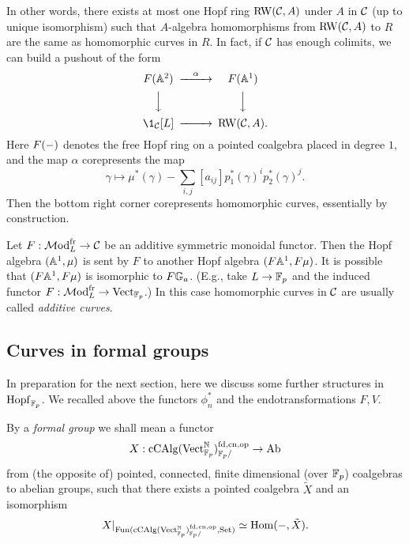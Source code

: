 \begin{remark} \label{rmk:construct-RW}
In other words, there exists at most one Hopf ring $\mathrm{RW}(\mathcal C, A)$ under $A$ in $\mathcal C$ (up to unique isomorphism) such that $A$-algebra homomorphisms from $\mathrm{RW}(\mathcal C, A)$ to $R$ are the same as homomorphic curves in $R$.
In fact, if $\mathcal C$ has enough colimits, we can build a pushout of the form
\begin{equation*}
\begin{CD}
F(\A^2) @>{\alpha}>> F(\A^1) \\
@VVV           @VVV  \\
\1_\scr{C}[L] @>>> \RW(\scr C, A).
\end{CD}
\end{equation*}
Here $F(\mathord-)$ denotes the free Hopf ring on a pointed coalgebra placed in degree $1$, and the map $\alpha$ corepresents the map \[ \gamma \mapsto \mu^*(\gamma) - \sum_{i,j} [a_{ij}] p_1^*(\gamma)^i p_2^*(\gamma)^j. \]
Then the bottom right corner corepresents homomorphic curves, essentially by construction.
\end{remark}


\begin{remark} \label{rmk:additive-curves}
Let $F: \mathcal{M}\mathrm{od}_L^{\mathrm{fr}} \to \mathcal C$ be an additive symmetric monoidal functor.
Then the Hopf algebra $(\mathbb A^1, \mu)$ is sent by $F$ to another Hopf algebra $(F\mathbb A^1, F\mu)$.
It is possible that $(F\mathbb A^1, F\mu)$ is isomorphic to $F{\mathbb G}_a$.
(E.g., take $L \to \mathbb{F}_p$ and the induced functor $F: \mathcal{M}\mathrm{od}_L^{\mathrm{fr}} \to \mathrm{Vect}_{\mathbb{F}_p}$.)
In this case homomorphic curves in $\mathcal C$ are usually called \emph{additive curves}.
\end{remark}


\subsection{Curves in formal groups}\label{subsec:curves}
In preparation for the next section, here we discuss some further structures in $\mathrm{Hopf}_{\mathbb{F}_p}$.
We recalled above the functors $\phi_n^*$ and the endotransformations $F,V$.

\begin{definition}
By a \emph{formal group} we shall mean a functor \[ X: \mathrm{cCAlg}(\mathrm{Vect}_{\mathbb{F}_p}^{\mathbb{N}})^{\mathrm{fd},\mathrm{cn},\mathrm{op}}_{\mathbb{F}_p/} \to \mathrm{Ab} \] from (the opposite of) pointed, connected, finite dimensional (over $\mathbb{F}_p$) coalgebras to abelian groups, such that there exists a pointed coalgebra $\tilde X$ and an isomorphism \[ X|_{\mathrm{Fun}(\mathrm{cCAlg}(\mathrm{Vect}_{\mathbb{F}_p}^{\mathbb{N}})^{\mathrm{fd},\mathrm{cn}, \mathrm{op}}_{\mathbb{F}_p/}, \mathrm{Set})} \simeq \operatorname{Hom}(\mathord-, \tilde X). \]
\end{definition}

